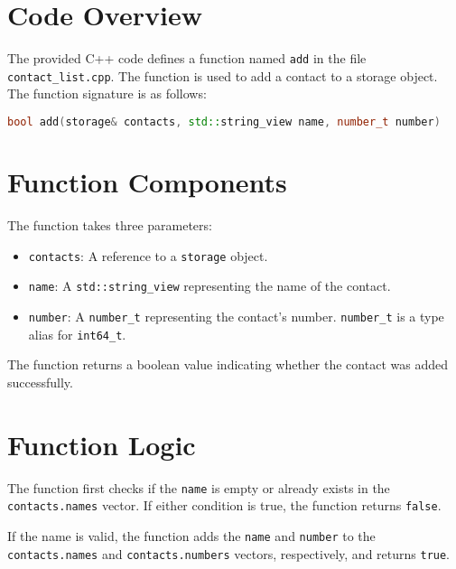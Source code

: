 \maketitle

\section{Code Overview}

The provided C++ code defines a function named \texttt{add} in the file \texttt{contact\_list.cpp}. The function is used to add a contact to a storage object. The function signature is as follows:

\begin{lstlisting}[language=C++]
bool add(storage& contacts, std::string_view name, number_t number)
\end{lstlisting}

\section{Function Components}

The function takes three parameters:

\begin{itemize}
    \item \texttt{contacts}: A reference to a \texttt{storage} object.
    \item \texttt{name}: A \texttt{std::string\_view} representing the name of the contact.
    \item \texttt{number}: A \texttt{number\_t} representing the contact's number. \texttt{number\_t} is a type alias for \texttt{int64\_t}.
\end{itemize}

The function returns a boolean value indicating whether the contact was added successfully.

\section{Function Logic}

The function first checks if the \texttt{name} is empty or already exists in the \texttt{contacts.names} vector. If either condition is true, the function returns \texttt{false}. 

If the name is valid, the function adds the \texttt{name} and \texttt{number} to the \texttt{contacts.names} and \texttt{contacts.numbers} vectors, respectively, and returns \texttt{true}.

